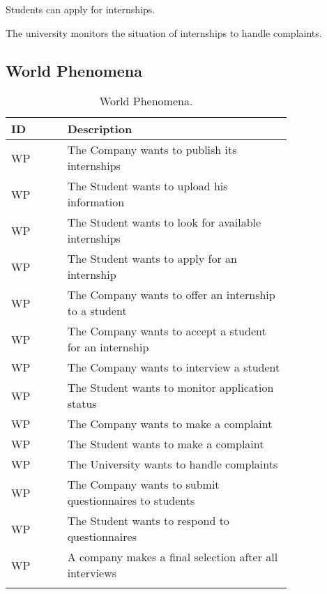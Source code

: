 Students can apply for internships.

The university monitors the situation of internships to handle complaints.

\subsection{World Phenomena}
\label{subsec:world_phenomena}%
\setcounter{wp}{1}
\newcommand{\cwp}{\thewp\stepcounter{wp}}
\begin{center}
    \begin{longtable}{ |l|p{0.8\linewidth}| }
        \hline
        \textbf{ID} & \textbf{Description}                                                \\
        \hline
        WP\cwp      & The Company wants to publish its internships\\
        \hline
        WP\cwp      & The Student wants to upload his information \\
        \hline
        WP\cwp      & The Student wants to look for available internships \\
        \hline
        WP\cwp      & The Student wants to apply for an internship \\
        \hline
        WP\cwp      & The Company wants to offer an internship to a student \\
        \hline
        WP\cwp      & The Company wants to accept a student for an internship \\
        \hline
        WP\cwp      & The Company wants to interview a student \\
        \hline
        WP\cwp      & The Student wants to monitor application status \\
        \hline
        WP\cwp      & The Company wants to make a complaint \\
        \hline
        WP\cwp      & The Student wants to make a complaint \\
        \hline
        WP\cwp      & The University wants to handle complaints \\
        \hline
        WP\cwp      & The Company wants to submit questionnaires to students \\
        \hline
        WP\cwp      & The Student wants to respond to questionnaires \\
        \hline
        WP\cwp      & A company makes a final selection after all interviews \\
        \hline
        \caption{World Phenomena.}
        \label{tab:worldph_tab}%
    \end{longtable}
\end{center}

